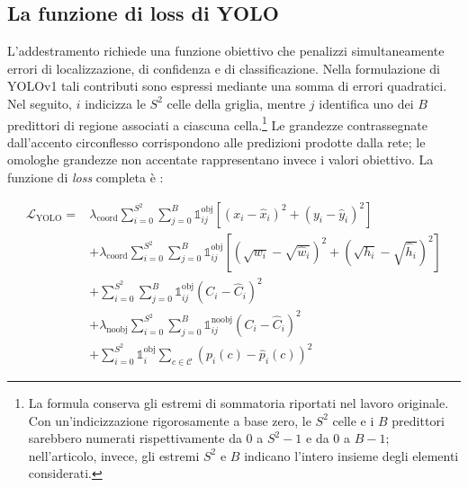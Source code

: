 \subsection{La funzione di loss di YOLO}

L'addestramento richiede una funzione obiettivo che penalizzi simultaneamente errori di localizzazione, di confidenza e di classificazione. Nella formulazione di YOLOv1 tali contributi sono espressi mediante una somma di errori quadratici. Nel seguito, $i$ indicizza le $S^2$ celle della griglia, mentre $j$ identifica uno dei $B$ predittori di regione associati a ciascuna cella.\footnote{La formula conserva gli estremi di sommatoria riportati nel lavoro originale. Con un'indicizzazione rigorosamente a base zero, le $S^2$ celle e i $B$ predittori sarebbero numerati rispettivamente da $0$ a $S^2-1$ e da $0$ a $B-1$; nell'articolo, invece, gli estremi $S^2$ e $B$ indicano l'intero insieme degli elementi considerati.} Le grandezze contrassegnate dall'accento circonflesso corrispondono alle predizioni prodotte dalla rete; le omologhe grandezze non accentate rappresentano invece i valori obiettivo. La funzione di \textit{loss} completa è \cite{Redmon2016YOLO}:

\begin{align}
    \mathcal{L}_{\mathrm{YOLO}}
    ={}&
    \lambda_{\mathrm{coord}}
    \sum_{i=0}^{S^2}
    \sum_{j=0}^{B}
    \mathbb{1}_{ij}^{\mathrm{obj}}
    \left[
        (x_i-\hat{x}_i)^2
        +(y_i-\hat{y}_i)^2
    \right]
    \nonumber\\
    &+
    \lambda_{\mathrm{coord}}
    \sum_{i=0}^{S^2}
    \sum_{j=0}^{B}
    \mathbb{1}_{ij}^{\mathrm{obj}}
    \left[
        \left(\sqrt{w_i}-\sqrt{\hat{w}_i}\right)^2
        +\left(\sqrt{h_i}-\sqrt{\hat{h}_i}\right)^2
    \right]
    \nonumber\\
    &+
    \sum_{i=0}^{S^2}
    \sum_{j=0}^{B}
    \mathbb{1}_{ij}^{\mathrm{obj}}
    (C_i-\hat{C}_i)^2
    \nonumber\\
    &+
    \lambda_{\mathrm{noobj}}
    \sum_{i=0}^{S^2}
    \sum_{j=0}^{B}
    \mathbb{1}_{ij}^{\mathrm{noobj}}
    (C_i-\hat{C}_i)^2
    \nonumber\\
    &+
    \sum_{i=0}^{S^2}
    \mathbb{1}_{i}^{\mathrm{obj}}
    \sum_{c\in\mathcal{C}}
    \left(p_i(c)-\hat{p}_i(c)\right)^2
    \label{eq:yolov1-loss}
\end{align}

